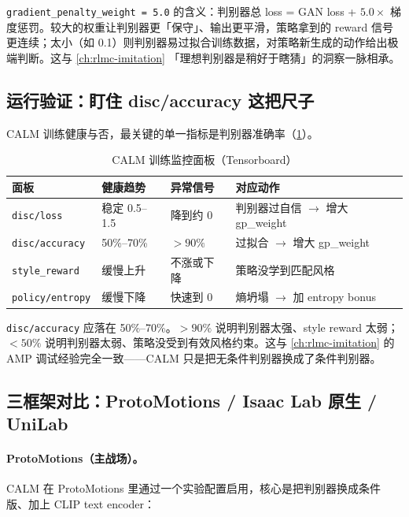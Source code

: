 \verb|gradient_penalty_weight = 5.0| 的含义：判别器总 loss = GAN loss + $5.0\times$ 梯度惩罚。较大的权重让判别器更「保守」、输出更平滑，策略拿到的 reward 信号更连续；太小（如 0.1）则判别器易过拟合训练数据，对策略新生成的动作给出极端判断。这与 \cref{ch:rlmc-imitation} 「理想判别器是稍好于瞎猜」的洞察一脉相承。

\subsection{运行验证：盯住 disc/accuracy 这把尺子}
\label{sec:rlmc-mm-calm-verify}

CALM 训练健康与否，最关键的单一指标是判别器准确率（\cref{tab:rlmc-mm-calm-monitor}）。

\begin{table}[ht]
\centering
\small
\caption{CALM 训练监控面板（Tensorboard）}
\label{tab:rlmc-mm-calm-monitor}
\begin{tabular}{@{}llll@{}}
\toprule
面板 & 健康趋势 & 异常信号 & 对应动作 \\
\midrule
\texttt{disc/loss} & 稳定 0.5--1.5 & 降到约 0 & 判别器过自信 $\to$ 增大 gp\_weight \\
\texttt{disc/accuracy} & 50\%--70\% & $>90\%$ & 过拟合 $\to$ 增大 gp\_weight \\
\texttt{style\_reward} & 缓慢上升 & 不涨或下降 & 策略没学到匹配风格 \\
\texttt{policy/entropy} & 缓慢下降 & 快速到 0 & 熵坍塌 $\to$ 加 entropy bonus \\
\bottomrule
\end{tabular}
\end{table}

\verb|disc/accuracy| 应落在 50\%--70\%。$>90\%$ 说明判别器太强、style reward 太弱；$<50\%$ 说明判别器太弱、策略没受到有效风格约束。这与 \cref{ch:rlmc-imitation} 的 AMP 调试经验完全一致——CALM 只是把无条件判别器换成了条件判别器。

\subsection{三框架对比：ProtoMotions / Isaac Lab 原生 / UniLab}
\label{sec:rlmc-mm-calm-three}

\paragraph{ProtoMotions（主战场）。}CALM 在 ProtoMotions 里通过一个实验配置启用，核心是把判别器换成条件版、加上 CLIP text encoder：

